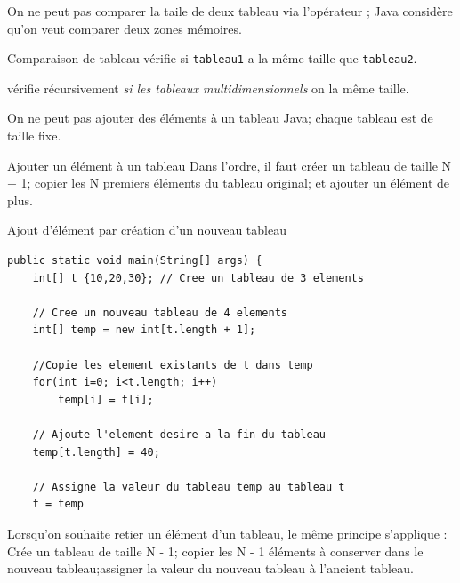 \documentclass{report}
\begin{document}
\begin{note}
On ne peut pas comparer la taile de deux tableau via
l'opérateur \entouree[gray]{\texttt{\footnotesize{==}}} ; Java
considère qu'on veut comparer deux zones mémoires.
\end{note}
\begin{Syntaxe*}{Comparaison de tableau}{}
 vérifie si \texttt{\footnotesize{tableau1}} a la même taille que \texttt{\footnotesize{tableau2}}.

 vérifie récursivement \textit{si les tableaux multidimensionnels} on la même taille.
\end{Syntaxe*}


\begin{note}
On ne peut pas ajouter des éléments à un tableau Java; chaque tableau est de taille fixe. 
\end{note}

\begin{Syntaxe*}{Ajouter un élément à un tableau}{}
Dans l'ordre, il faut créer un tableau de taille N + 1; copier
les N premiers éléments du tableau original; et ajouter un élément de plus.
\end{Syntaxe*}


\begin{EExample*}{Ajout d'élément par création d'un nouveau tableau}{}
\begin{lstlisting}[style=JavaDraculaWhite]
	public static void main(String[] args) {
	int[] t {10,20,30}; // Cree un tableau de 3 elements

	// Cree un nouveau tableau de 4 elements 
	int[] temp = new int[t.length + 1];

	//Copie les element existants de t dans temp
	for(int i=0; i<t.length; i++)
		temp[i] = t[i];

	// Ajoute l'element desire a la fin du tableau 
	temp[t.length] = 40;
	
	// Assigne la valeur du tableau temp au tableau t
	t = temp
\end{lstlisting}
\end{EExample*}

\begin{note}
Lorsqu'on souhaite retier un élément d'un tableau, le même 
principe s'applique : Crée un tableau de taille N - 1; 
copier les N - 1 éléments à conserver dans le nouveau tableau;assigner la valeur du nouveau tableau à l'ancient tableau.
\end{note}
\end{document}
